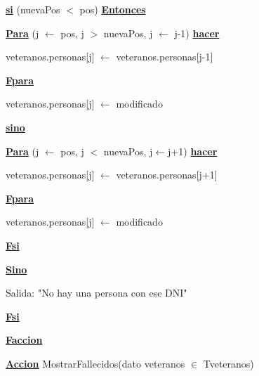 \documentclass{article}
\begin{document}
                \hspace{16mm}\underline{\textbf{si}} (nuevaPos $<$ pos) \underline{\textbf{Entonces}}

                    \hspace{20mm}\underline{\textbf{Para}} (j $\leftarrow$ pos, j $>$ nuevaPos, j $\leftarrow$ j-1) \underline{\textbf{hacer}}

                        \hspace{24mm}veteranos.personas[j] $\leftarrow$ veteranos.personas[j-1]
                    
                    \hspace{20mm}\underline{\textbf{Fpara}}

                    \hspace{20mm}veteranos.personas[j] $\leftarrow$ modificado

                \hspace{16mm}\underline{\textbf{sino}}

                    \hspace{20mm}\underline{\textbf{Para}} (j $\leftarrow$ pos, j $<$ nuevaPos, j$\leftarrow$j+1) \underline{\textbf{hacer}}

                        \hspace{24mm}veteranos.personas[j] $\leftarrow$ veteranos.personas[j+1]

                    \hspace{20mm}\underline{\textbf{Fpara}}
                    
                    \hspace{20mm}veteranos.personas[j] $\leftarrow$ modificado

                \hspace{16mm}\underline{\textbf{Fsi}}

            \hspace{12mm}\underline{\textbf{Sino}}

                \hspace{16mm}Salida: "No hay una persona con ese DNI"

            \hspace{12mm}\underline{\textbf{Fsi}}

    \hspace{4mm}\underline{\textbf{Faccion}}

    \vspace{4mm}

    \hspace{4mm}\underline{\textbf{Accion}} MostrarFallecidos(dato veteranos $\in$ Tveteranos)
\end{document}
